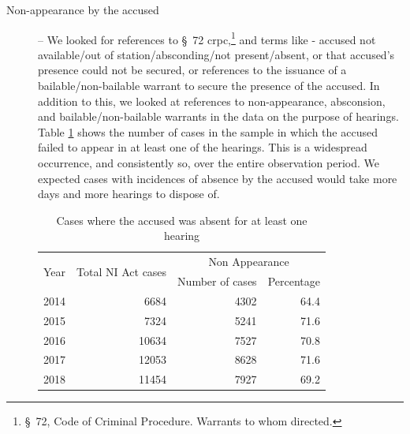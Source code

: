 \documentclass[12pt,a4paper]{article}
\begin{document}
\begin{description}
\item [Non-appearance by the accused] -- We looked for references to \S~72 \gls{crpc},\footnote{\S~72, Code of Criminal Procedure. Warrants to whom directed.} and terms like - accused not available/out of station/absconding/not present/absent, or that accused’s presence could not be secured, or references to the issuance of a bailable/non-bailable warrant to secure the presence of the accused. In addition to this, we looked at references to non-appearance, absconsion, and bailable/non-bailable warrants in the data on the purpose of hearings. Table \ref{tab:nonAppearance_yearWise} shows the number of cases in the sample in which the accused failed to appear in at least one of the hearings. This is a widespread occurrence, and consistently so, over the entire observation period. We expected cases with incidences of absence by the accused would take more days and more hearings to dispose of.

\begin{table}[!ht]
\caption{Cases where the accused was absent for at least one hearing} \label{tab:nonAppearance_yearWise}
\centering
\footnotesize
\begin{tabular}{lrrr}
\toprule
\multirow{2}{*}{Year} & \multirow{2}{*}{Total NI Act cases} & \multicolumn{2}{c}{Non Appearance}\\
\cmidrule{3-4}
&& Number of cases & Percentage \\
\midrule %
2014 & 6684 & 4302 & 64.4 \\
2015 & 7324 & 5241 & 71.6 \\
2016 & 10634 & 7527 & 70.8 \\
2017 & 12053 & 8628 & 71.6 \\
2018 & 11454 & 7927 & 69.2 \\
\bottomrule
\end{tabular}

\end{table}

\item[]


\end{description}
\end{document}
